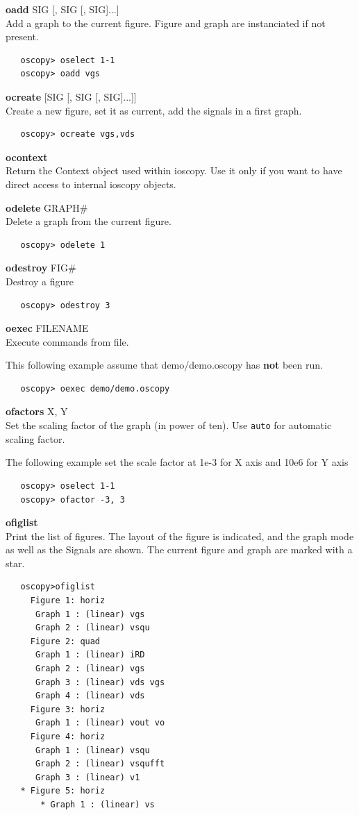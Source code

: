 \documentclass[a4paper,11pt]{article}
\begin{document}
\newcommand{\ocmd}[2]{{\large\vspace{5mm}\noindent\textbf{#1} #2\\}}

\ocmd{oadd}{SIG [, SIG [, SIG]...]}
   Add a graph to the current figure. Figure and graph are instanciated if not present.

\begin{verbatim}
   oscopy> oselect 1-1
   oscopy> oadd vgs
\end{verbatim}

\ocmd{ocreate}{[SIG [, SIG [, SIG]...]]}
   Create a new figure, set it as current, add the signals in a first graph.

\begin{verbatim}
   oscopy> ocreate vgs,vds
\end{verbatim}

\ocmd{ocontext}{\ }
   Return the Context object used within ioscopy.
 Use it only if you want to have direct access to internal ioscopy objects.

\ocmd{odelete}{GRAPH\#}
   Delete a graph from the current figure.

\begin{verbatim}
   oscopy> odelete 1
\end{verbatim}

\ocmd{odestroy}{FIG\#}
   Destroy a figure

\begin{verbatim}
   oscopy> odestroy 3
\end{verbatim}

\ocmd{oexec}{FILENAME}
   Execute commands from file.

   This following example assume that demo/demo.oscopy has \textbf{not} been run.

\begin{verbatim}
   oscopy> oexec demo/demo.oscopy
\end{verbatim}

\ocmd{ofactors}{X, Y}
   Set the scaling factor of the graph (in power of ten). Use \texttt{auto} for automatic scaling factor.

\noindent   The following example set the scale factor at 1e-3 for X axis and 10e6 for Y axis
\begin{verbatim}
   oscopy> oselect 1-1
   oscopy> ofactor -3, 3
\end{verbatim}

\ocmd{ofiglist}{\ }
   Print the list of figures. The layout of the figure is indicated, and the graph mode as well as the Signals are shown. The current figure and graph are marked with a star.
\begin{verbatim}
   oscopy>ofiglist
     Figure 1: horiz
      Graph 1 : (linear) vgs
      Graph 2 : (linear) vsqu
     Figure 2: quad
      Graph 1 : (linear) iRD
      Graph 2 : (linear) vgs
      Graph 3 : (linear) vds vgs
      Graph 4 : (linear) vds
     Figure 3: horiz
      Graph 1 : (linear) vout vo
     Figure 4: horiz
      Graph 1 : (linear) vsqu
      Graph 2 : (linear) vsqufft
      Graph 3 : (linear) v1
   * Figure 5: horiz
       * Graph 1 : (linear) vs
\end{verbatim}
\end{document}
